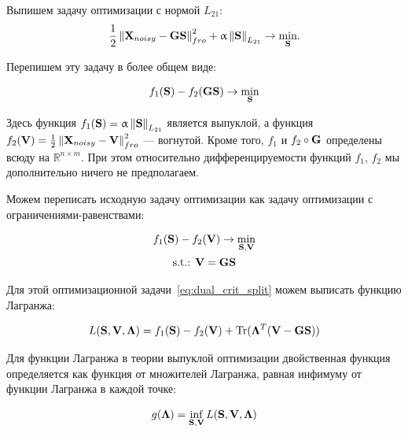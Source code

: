 Выпишем задачу оптимизации с нормой $L_{21}$:
\begin{equation}
    \frac{1}{2}\left\lVert\mathbf{X}_{noisy} - \mathbf{G}\mathbf{S}\right\rVert^2_{fro} + \upalpha \left\lVert\mathbf{S}\right\rVert_{L_{21}}
    \rightarrow \underset{\mathbf{S}}{\min}.
    \label{eq:l21_reg_func_crit}
\end{equation}

Перепишем эту задачу в более общем виде:

\begin{equation}
    f_1(\mathbf{S}) - f_2(\mathbf{G}\mathbf{S}) \rightarrow \min_{\mathbf{S}}
    \label{eq:dual_init_crit}
\end{equation}

Здесь функция $f_1(\mathbf{S})=\upalpha \left\lVert\mathbf{S}\right\rVert_{L_{21}}$ является
выпуклой, а функция $f_2(\mathbf{V})=\frac{1}{2}\left\lVert\mathbf{X}_{noisy} - \mathbf{V}\right\rVert^2_{fro}$ --- вогнутой.
Кроме того, $f_1$ и $f_2\circ\mathbf{G}$ определены всюду на $\mathbb{R}^{n\times m}$.
При этом относительно дифференцируемости функций $f_1$, $f_2$ мы дополнительно
ничего не предполагаем.

Можем переписать исходную задачу оптимизации как задачу оптимизации с
ограничениями-равенствами:

\begin{equation}
    \begin{gathered}
        f_1(\mathbf{S}) - f_2(\mathbf{V}) \rightarrow \min_{\mathbf{S},\mathbf{V}}\\
        \text{s.t.: } \mathbf{V} = \mathbf{G}\mathbf{S}
    \end{gathered}
    \label{eq:dual_crit_split}
\end{equation}


Для этой оптимизационной задачи~\ref{eq:dual_crit_split} можем выписать функцию Лагранжа:

\begin{equation}
    L(\mathbf{S}, \mathbf{V}, \mathbf{\Lambda}) = f_1(\mathbf{S}) - f_2(\mathbf{V}) + \operatorname*{Tr}(\mathbf{\Lambda}^T(\mathbf{V} - \mathbf{G}\mathbf{S}))
    \label{eq:dual_lagrangian}
\end{equation}

Для функции Лагранжа в теории выпуклой оптимизации двойственная
функция определяется как функция от множителей Лагранжа,
равная инфимуму от функции Лагранжа в каждой точке:

\begin{equation}
    g(\mathbf{\Lambda}) = \inf_{\mathbf{S}, \mathbf{V}} L(\mathbf{S}, \mathbf{V}, \mathbf{\Lambda})
    \label{eq:dual_dual_func_def}
\end{equation}

